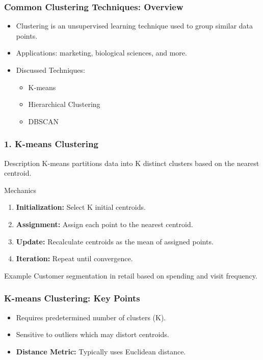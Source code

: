 \documentclass[aspectratio=169]{beamer}
\begin{document}
\begin{frame}[fragile]
  \frametitle{Common Clustering Techniques: Overview}
  \begin{itemize}
    \item Clustering is an unsupervised learning technique used to group similar data points.
    \item Applications: marketing, biological sciences, and more.
    \item Discussed Techniques:
    \begin{itemize}
      \item K-means
      \item Hierarchical Clustering
      \item DBSCAN
    \end{itemize}
  \end{itemize}
\end{frame}

\begin{frame}[fragile]
  \frametitle{1. K-means Clustering}
  \begin{block}{Description}
    K-means partitions data into K distinct clusters based on the nearest centroid.
  \end{block}
  
  \begin{block}{Mechanics}
    \begin{enumerate}
      \item \textbf{Initialization:} Select K initial centroids.
      \item \textbf{Assignment:} Assign each point to the nearest centroid.
      \item \textbf{Update:} Recalculate centroids as the mean of assigned points.
      \item \textbf{Iteration:} Repeat until convergence.
    \end{enumerate}
  \end{block}
  
  \begin{block}{Example}
    Customer segmentation in retail based on spending and visit frequency.
  \end{block}
\end{frame}

\begin{frame}[fragile]
  \frametitle{K-means Clustering: Key Points}
  \begin{itemize}
    \item Requires predetermined number of clusters (K).
    \item Sensitive to outliers which may distort centroids.
    \item \textbf{Distance Metric:} Typically uses Euclidean distance.
  \end{itemize}
\end{frame}
\end{document}
